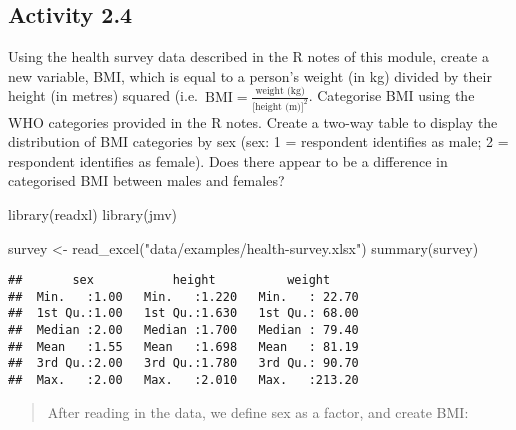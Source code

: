 \documentclass[
]{memoir}
\newenvironment{Shaded}{\begin{snugshade}}{\end{snugshade}}
\newcommand{\AttributeTok}[1]{\textcolor[rgb]{0.77,0.63,0.00}{#1}}
\newcommand{\DecValTok}[1]{\textcolor[rgb]{0.00,0.00,0.81}{#1}}
\newcommand{\FunctionTok}[1]{\textcolor[rgb]{0.00,0.00,0.00}{#1}}
\newcommand{\NormalTok}[1]{#1}
\newcommand{\OtherTok}[1]{\textcolor[rgb]{0.56,0.35,0.01}{#1}}
\newcommand{\SpecialCharTok}[1]{\textcolor[rgb]{0.00,0.00,0.00}{#1}}
\newcommand{\StringTok}[1]{\textcolor[rgb]{0.31,0.60,0.02}{#1}}
\begin{document}
\hypertarget{activity-2.4}{%
\subsection*{Activity 2.4}\label{activity-2.4}}

Using the health survey data described in the R notes of this module, create a new variable, BMI, which is equal to a person's weight (in kg) divided by their height (in metres) squared (i.e.~\(\text{BMI} = \frac{\text{weight (kg)}}{\text{[height (m)]}^2}\). Categorise BMI using the WHO categories provided in the R notes. Create a two-way table to display the distribution of BMI categories by sex (sex: 1 = respondent identifies as male; 2 = respondent identifies as female). Does there appear to be a difference in categorised BMI between males and females?

\begin{Shaded}
\begin{Highlighting}[]
\FunctionTok{library}\NormalTok{(readxl)}
\FunctionTok{library}\NormalTok{(jmv)}

\NormalTok{survey }\OtherTok{\textless{}{-}} \FunctionTok{read\_excel}\NormalTok{(}\StringTok{"data/examples/health{-}survey.xlsx"}\NormalTok{)}
\FunctionTok{summary}\NormalTok{(survey)}
\end{Highlighting}
\end{Shaded}

\begin{verbatim}
##       sex           height          weight      
##  Min.   :1.00   Min.   :1.220   Min.   : 22.70  
##  1st Qu.:1.00   1st Qu.:1.630   1st Qu.: 68.00  
##  Median :2.00   Median :1.700   Median : 79.40  
##  Mean   :1.55   Mean   :1.698   Mean   : 81.19  
##  3rd Qu.:2.00   3rd Qu.:1.780   3rd Qu.: 90.70  
##  Max.   :2.00   Max.   :2.010   Max.   :213.20
\end{verbatim}

\begin{quote}
After reading in the data, we define sex as a factor, and create BMI:
\end{quote}

\begin{Shaded}
\end{Shaded}
\end{document}
